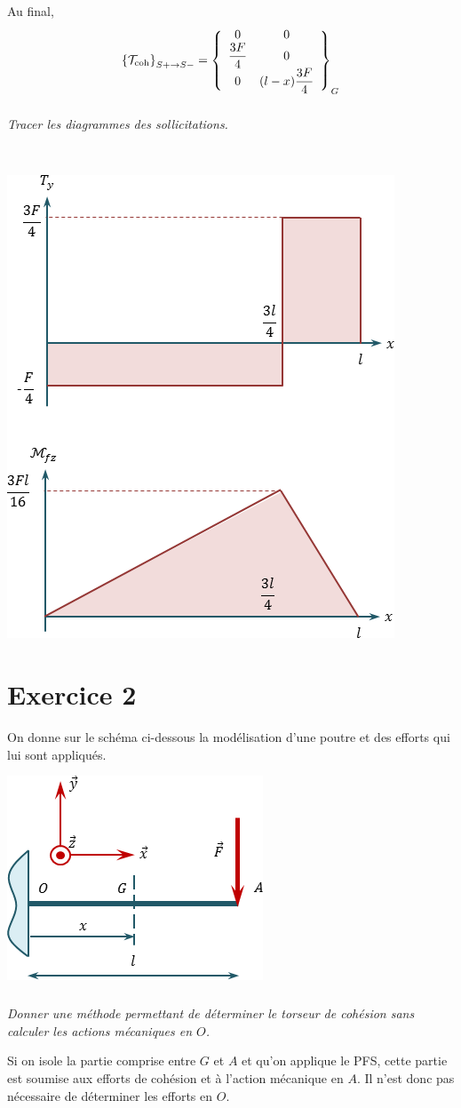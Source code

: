 \documentclass[10pt,fleqn]{article} %
\begin{document}
\begin{multicols}{1}
\begin{corrige}
Au final,
$$\torseurscoh_{S+\rightarrow S-}
=\torseurcol{0}{\dfrac{3F}{4}}{0}{0}{0}{ (l-x) \dfrac{3F}{4}}{G}
$$
\end{corrige}
\else 
\fi

\subparagraph{}
\textit{Tracer les diagrammes des sollicitations.}
\ifprof
\begin{corrige}~\\

\begin{center}
\includegraphics[width=.5\textwidth]{images/exo_01_corr}
\end{center}
\end{corrige}
\else 
\fi



\section*{Exercice 2}
\setcounter{subparagraph}{0}
On donne sur le schéma ci-dessous la modélisation d'une poutre et des efforts qui lui sont appliqués.
\begin{center}
\includegraphics[width=.45\textwidth]{images/exo_01_01}
\end{center}

\subparagraph{}
\textit{Donner une méthode permettant de déterminer le torseur de cohésion sans calculer les actions mécaniques en $O$.}
\ifprof
\begin{corrige} Si on isole la partie comprise entre $G$ et $A$ et qu'on applique le PFS, cette partie est soumise aux efforts de cohésion et à l'action mécanique en $A$. Il n'est donc pas nécessaire de déterminer les efforts en $O$.
\end{corrige}
\else
\fi


\end{multicols}
\end{document}
